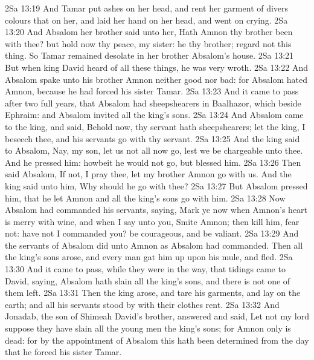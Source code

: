 \vs 2Sa 13:19 And Tamar put ashes on her head, and rent her garment of divers colours that  on her, and laid her hand on her head, and went on crying.
\vs 2Sa 13:20 And Absalom her brother said unto her, Hath Amnon thy brother been with thee? but hold now thy peace, my sister: he  thy brother; regard not this thing. So Tamar remained desolate in her brother Absalom's house.
\vs 2Sa 13:21 But when king David heard of all these things, he was very wroth.
\vs 2Sa 13:22 And Absalom spake unto his brother Amnon neither good nor bad: for Absalom hated Amnon, because he had forced his sister Tamar.
\vs 2Sa 13:23 And it came to pass after two full years, that Absalom had sheepshearers in Baalhazor, which  beside Ephraim: and Absalom invited all the king's sons.
\vs 2Sa 13:24 And Absalom came to the king, and said, Behold now, thy servant hath sheepshearers; let the king, I beseech thee, and his servants go with thy servant.
\vs 2Sa 13:25 And the king said to Absalom, Nay, my son, let us not all now go, lest we be chargeable unto thee. And he pressed him: howbeit he would not go, but blessed him.
\vs 2Sa 13:26 Then said Absalom, If not, I pray thee, let my brother Amnon go with us. And the king said unto him, Why should he go with thee?
\vs 2Sa 13:27 But Absalom pressed him, that he let Amnon and all the king's sons go with him.
\vs 2Sa 13:28 Now Absalom had commanded his servants, saying, Mark ye now when Amnon's heart is merry with wine, and when I say unto you, Smite Amnon; then kill him, fear not: have not I commanded you? be courageous, and be valiant.
\vs 2Sa 13:29 And the servants of Absalom did unto Amnon as Absalom had commanded. Then all the king's sons arose, and every man gat him up upon his mule, and fled.
\vs 2Sa 13:30 And it came to pass, while they were in the way, that tidings came to David, saying, Absalom hath slain all the king's sons, and there is not one of them left.
\vs 2Sa 13:31 Then the king arose, and tare his garments, and lay on the earth; and all his servants stood by with their clothes rent.
\vs 2Sa 13:32 And Jonadab, the son of Shimeah David's brother, answered and said, Let not my lord suppose  they have slain all the young men the king's sons; for Amnon only is dead: for by the appointment of Absalom this hath been determined from the day that he forced his sister Tamar.
